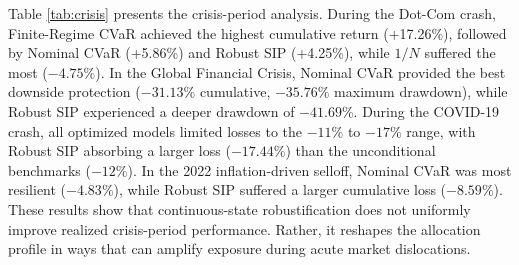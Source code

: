 \documentclass[smallextended]{svjour3}
\begin{document}
\begin{table}[htbp]
\centering
\caption{Crisis-period performance}
\label{tab:crisis}
\end{table}

Table \ref{tab:crisis} presents the crisis-period analysis. During the Dot-Com crash, Finite-Regime CVaR achieved the highest cumulative return (+17.26\%), followed by Nominal CVaR (+5.86\%) and Robust SIP (+4.25\%), while $1/N$ suffered the most ($-4.75\%$). In the Global Financial Crisis, Nominal CVaR provided the best downside protection ($-31.13\%$ cumulative, $-35.76\%$ maximum drawdown), while Robust SIP experienced a deeper drawdown of $-41.69\%$. During the COVID-19 crash, all optimized models limited losses to the $-11\%$ to $-17\%$ range, with Robust SIP absorbing a larger loss ($-17.44\%$) than the unconditional benchmarks ($-12\%$). In the 2022 inflation-driven selloff, Nominal CVaR was most resilient ($-4.83\%$), while Robust SIP suffered a larger cumulative loss ($-8.59\%$). These results show that continuous-state robustification does not uniformly improve realized crisis-period performance. Rather, it reshapes the allocation profile in ways that can amplify exposure during acute market dislocations.
\end{document}
